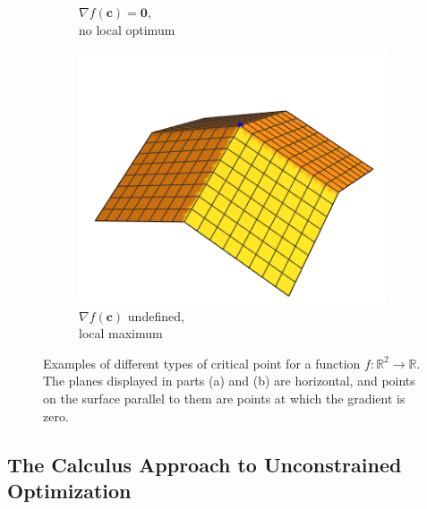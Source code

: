 \documentclass[11pt]{article}
\theoremstyle{definition} %
\begin{document}
\begin{figure}[h]
\begin{subfigure}{0.3\textwidth}
		\caption{$\nabla f(\mathbf{c}) = \mathbf{0}$,\\no local optimum}
	\end{subfigure}
	\hfill
	\begin{subfigure}{0.3\textwidth}
		\centering
		\includegraphics[width=\textwidth]{figures/cpsurf03.png}
		\caption{$\nabla f(\mathbf{c})$ undefined,\\local maximum}
	\end{subfigure}
	
	\caption{Examples of different types of critical point for a function $f : \mathbb{R}^2 \to \mathbb{R}$. The planes displayed in parts (a) and (b) are horizontal, and points on the surface parallel to them are points at which the gradient is zero.}
	\label{fig:critical3d}
\end{figure}

\newpage

\subsection{The Calculus Approach to Unconstrained Optimization}
\label{subsec:calculus}
\end{document}
